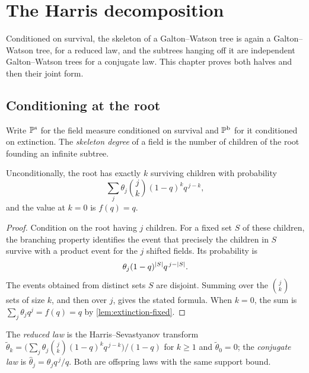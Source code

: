 \chapter{The Harris decomposition}
\label{ch:harris}

Conditioned on survival, the skeleton of a Galton--Watson tree is again a Galton--Watson
tree, for a reduced law, and the subtrees hanging off it are independent Galton--Watson trees
for a conjugate law. This chapter proves both halves and then their joint form.

\section{Conditioning at the root}

\begin{definition}
\label{def:conditioned}
\leanok
Write $\mathbb{P}^{\mathrm{s}}$ for the field measure conditioned on survival and
$\mathbb{P}^{\mathrm{b}}$ for it conditioned on extinction. The \emph{skeleton degree} of a field
is the number of children of the root founding an infinite subtree.
\end{definition}

\begin{lemma}
\label{lem:surviveWeight}
\leanok
Unconditionally, the root has exactly $k$ surviving children with probability
\[
  \sum_{j}\theta_j\binom{j}{k}(1-q)^{k}q^{\,j-k},
\]
and the value at $k=0$ is $f(q)=q$.
\end{lemma}

\begin{proof}
\leanok
Condition on the root having $j$ children. For a fixed set $S$ of these children, the
branching property identifies the event that precisely the children in $S$ survive with a
product event for the $j$ shifted fields. Its probability is
\[
  \theta_j(1-q)^{\lvert S \rvert}q^{\,j-\lvert S \rvert}.
\]
The events obtained from distinct sets $S$ are disjoint. Summing over the
$\binom{j}{k}$ sets of size $k$, and then over $j$, gives the stated formula. When $k=0$,
the sum is $\sum_j\theta_jq^j=f(q)=q$ by
\cref{lem:extinction-fixed}.
\end{proof}

\begin{definition}
\label{def:reduced}
\leanok
The \emph{reduced law} is the Harris--Sevastyanov transform
$\tilde\theta_k=\bigl(\sum_j\theta_j\binom{j}{k}(1-q)^kq^{\,j-k}\bigr)/(1-q)$ for $k\geq1$ and
$\tilde\theta_0=0$; the \emph{conjugate law} is $\hat\theta_j=\theta_jq^{\,j}/q$. Both are
offspring laws with the same support bound.
\end{definition}

